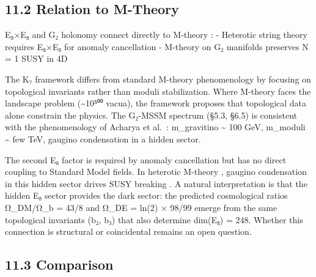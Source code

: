 \documentclass[11pt,a4paper]{article}
\begin{document}
\subsection{11.2 Relation to M-Theory}\label{relation-to-m-theory}

E₈×E₈ and G₂ holonomy connect directly to M-theory \cite{24,33,34}: - Heterotic string theory requires E₈×E₈ for anomaly cancellation \cite{19} - M-theory on G₂ manifolds preserves N = 1 SUSY in 4D \cite{24,34}

The K₇ framework differs from standard M-theory phenomenology \cite{35} by focusing on topological invariants rather than moduli stabilization. Where M-theory faces the landscape problem (\textasciitilde10⁵⁰⁰ vacua), the framework proposes that topological data alone constrain the physics. The G₂-MSSM spectrum (§5.3, §6.5) is consistent with the phenomenology of Acharya et al.~\cite{33}: m\_\allowbreak{}gravitino \textasciitilde{} 100 GeV, m\_\allowbreak{}moduli \textasciitilde{} few TeV, gaugino condensation in a hidden sector.

The second E₈ factor is required by anomaly cancellation but has no direct coupling to Standard Model fields. In heterotic M-theory \cite{32}, gaugino condensation in this hidden sector drives SUSY breaking \cite{33}. A natural interpretation is that the hidden E₈ sector provides the dark sector: the predicted cosmological ratios Ω\_\allowbreak{}DM/Ω\_\allowbreak{}b = 43/8 and Ω\_\allowbreak{}DE = ln(2) × 98/99 emerge from the same topological invariants (b₂, b₃) that also determine dim(E₈) = 248. Whether this connection is structural or coincidental remains an open question.

\subsection{11.3 Comparison}\label{comparison}
\end{document}

